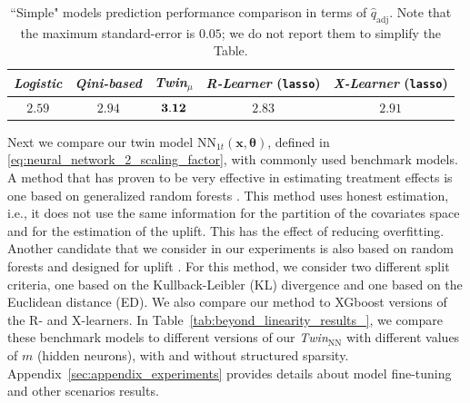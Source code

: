 \documentclass{article}
\def\qadj{\hat{q}_{\mathrm{adj}}}
\def\x{\mathbf x}
\newtheorem{remark}{Remark}
\begin{document}
\begin{table}[!ht]
    \centering
    \begin{tabular}{ccccc}
        \hline
        {\it Logistic} & {\it Qini-based} & {\it Twin$_{\mu}$} & {\it R-Learner }(\texttt{lasso}) & {\it X-Learner }(\texttt{lasso}) \\
        \hline
         $2.59$ & $2.94$ & $\bf{3.12}$ & $2.83$ & $2.91$\\
         \hline
    \end{tabular}
    \vspace{2mm}
    \caption{``Simple" models prediction performance comparison in terms of $\qadj$. Note that the maximum standard-error is $0.05$; we do not report them to simplify the Table.}
    \label{tab:param_estimation_results_}
\end{table}




Next we compare our twin model $\mathrm{NN}_{1t}(\x, \boldsymbol{\theta})$, defined in \eqref{eq:neural_network_2_scaling_factor}, with commonly used benchmark models. A method that has proven to be very effective in estimating treatment effects is one based on generalized random forests \citep{athey2019generalized}. This method uses honest estimation, i.e., it does not use the same information for the partition of the covariates space and for the estimation of the uplift. This has the effect of reducing overfitting. Another candidate that we consider in our experiments is also based on random forests and designed for uplift \citep{guelman2012random}. For this method, we consider two different split criteria, one based on the Kullback-Leibler (KL) divergence and one based on the Euclidean distance (ED). We also compare our method to XGboost \citep{chen2015xgboost} versions of the R- and X-learners. In Table~\ref{tab:beyond_linearity_results_}, we compare these benchmark models to different versions of our {\it Twin$_{\mathrm{NN}}$} with different values of $m$ (hidden neurons), with and without structured sparsity. Appendix~\ref{sec:appendix_experiments} provides details about model fine-tuning and other scenarios results. \\

\end{document}
